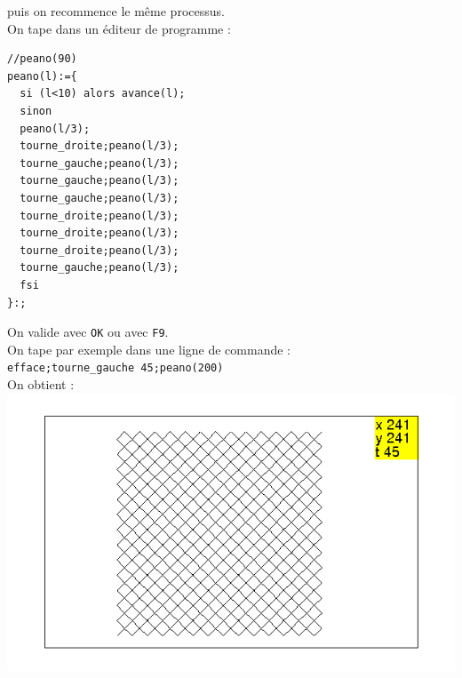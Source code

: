 \documentclass[a4paper,11pt]{book}
\begin{document}
puis on recommence le m\^eme processus.\\
On tape dans un \'editeur de programme :
\begin{verbatim}
//peano(90)
peano(l):={
  si (l<10) alors avance(l);
  sinon
  peano(l/3);
  tourne_droite;peano(l/3);
  tourne_gauche;peano(l/3);
  tourne_gauche;peano(l/3);
  tourne_gauche;peano(l/3);
  tourne_droite;peano(l/3);
  tourne_droite;peano(l/3);
  tourne_droite;peano(l/3);
  tourne_gauche;peano(l/3);
  fsi
}:;
\end{verbatim}
On valide avec {\tt OK} ou avec {\tt F9}.\\
On tape par exemple dans une ligne de commande :\\
{\tt efface;tourne\_gauche 45;peano(200)}\\
On obtient :\\
\includegraphics[width=\textwidth]{tortpeano1}
\end{document}
